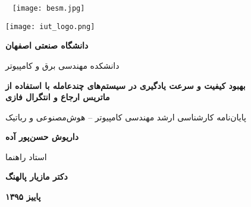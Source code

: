 

\thispagestyle{empty}
\mbox{}
\pagebreak

\thispagestyle{empty}
\begin{center}
	~\vfill
	\texttt{[image: besm.jpg]}
	~\vfill
\end{center}
\pagebreak

\thispagestyle{empty}
\begin{center}
\texttt{[image: iut\_logo.png]}
\vspace{0.4cm}

\textbf{دانشگاه صنعتی اصفهان}\\
\vspace{0.4cm}

{\large

	دانشکده مهندسی برق و کامپیوتر
}
\vspace{3.5cm}

{\Large
	\textbf{بهبود کیفیت و سرعت یادگیری در سیستم‌های چندعامله با استفاده از
	\\
	ماتریس ارجاع و انتگرال فازی}\\
}
\vspace{2.5cm}

{\Large
	پایان‌نامه کارشناسی ارشد مهندسی کامپیوتر -- هوش‌مصنوعی و رباتیک\\
}
\vspace{1cm}

{\large
	\textbf{داریوش حسن‌پور آده}\\
}
\vspace{2.5cm}

{\large
	استاد راهنما\\
}
\vspace{0.5cm}

{\large
	\textbf{دکتر مازیار پالهنگ}\\
}
\vfill

\textbf{پاییز ۱۳۹۵}

\end{center}
\restoregeometry
\pagebreak

